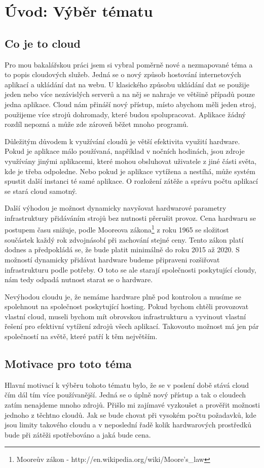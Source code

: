 \chapter{Úvod: Výběr tématu}

\section{Co je to cloud}
Pro mou bakalářskou práci jsem si vybral poměrně nové a nezmapované téma a to popis cloudových služeb. Jedná se o nový způsob hostování internetových aplikací a ukládání dat na webu. U klasického způsobu ukládání dat se použije jeden nebo více nezávislých serverů a na něj se nahraje ve většině případů pouze jedna aplikace. Cloud nám přináší nový přístup, místo abychom měli jeden stroj, použijeme více strojů dohromady, které budou spolupracovat. Aplikace žádný rozdíl nepozná a může zde zároveň běžet mnoho programů. 

Důležitým důvodem k využívání cloudů je větší efektivita využití hardware. Pokud je aplikace málo používaná, například v nočních hodinách, jsou zdroje využívány jinými aplikacemi, které mohou obsluhovat uživatele z jiné části světa, kde je třeba odpoledne. Nebo pokud je aplikace vytížena a nestíhá, může systém spustit další instanci té samé aplikace. O rozložení zátěže a správu počtu aplikací se stará cloud samotný.

Další výhodou je možnost dynamicky navyšovat hardwarové parametry infrastruktury přidáváním strojů bez nutnosti přerušit provoz. Cena hardwaru se postupem času snižuje, podle Mooreova zákona\footnote{Mooreův zákon - http://en.wikipedia.org/wiki/Moore's\_law} z roku 1965 se složitost součástek každý rok zdvojnásobí při zachování stejné ceny. Tento zákon platí dodnes a předpokládá se, že bude platit minimálně do roku 2015 až 2020. S možností dynamicky přidávat hardware budeme připraveni rozšiřovat infrastrukturu podle potřeby. O toto se ale starají společnosti poskytující cloudy, nám tedy odpadá nutnost starat se o hardware. 

Nevýhodou cloudu je, že nemáme hardware plně pod kontrolou a musíme se spolehnout na společnost poskytující hosting. Pokud bychom chtěli provozovat vlastní cloud, museli bychom mít obrovskou infrastrukturu a vyvinout vlastní řešení pro efektivní vytížení zdrojů všech aplikací. Takovouto možnost má jen pár společností na světě, které patří k těm největším.

\section{Motivace pro toto téma}
Hlavní motivací k výběru tohoto tématu bylo, že se v poslení době stává cloud čím dál tím více používanější. Jedná se o úplně nový přístup a tak o cloudech zatím nenajdeme mnoho zdrojů. Přišlo mi zajímavé vyzkoušet a prověřit možnosti jednoho z těchtno cloudů. Jak se bude chovat při vysokém počtu požadavků, kde jsou limity takového cloudu a v neposlední řadě kolik hardwarových prostředků bude při zátěži spotřebováno a jaká bude cena.


